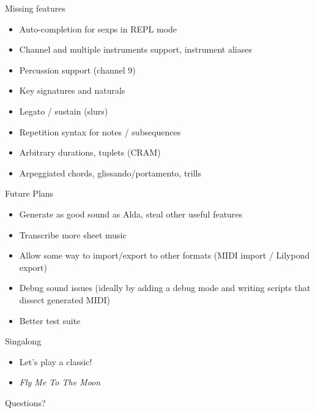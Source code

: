 \documentclass[presentation]{beamer}
\begin{document}
\begin{frame}[label=sec-4-1]{Missing features}
\begin{itemize}
\item Auto-completion for sexps in REPL mode
\item Channel and multiple instruments support, instrument aliases
\item Percussion support (channel 9)
\item Key signatures and naturals
\item Legato / sustain (slurs)
\item Repetition syntax for notes / subsequences
\item Arbitrary durations, tuplets (CRAM)
\item Arpeggiated chords, glissando/portamento, trills
\end{itemize}
\end{frame}

\begin{frame}[label=sec-4-2]{Future Plans}
\begin{itemize}
\item Generate as good sound as Alda, steal other useful features
\item Transcribe more sheet music
\item Allow some way to import/export to other formats (MIDI import /
Lilypond export)
\item Debug sound issues (ideally by adding a debug mode and writing
scripts that dissect generated MIDI)
\item Better test suite
\end{itemize}
\end{frame}

\begin{frame}[label=sec-4-3]{Singalong}
\newfontfamily{}

\begin{itemize}
\item Let's play a classic!
\item {}\normalfont{} \emph{Fly Me To The Moon} \normalfont
\end{itemize}
\end{frame}

\begin{frame}[label=sec-4-4]{Questions?}
\end{frame}
\end{document}
